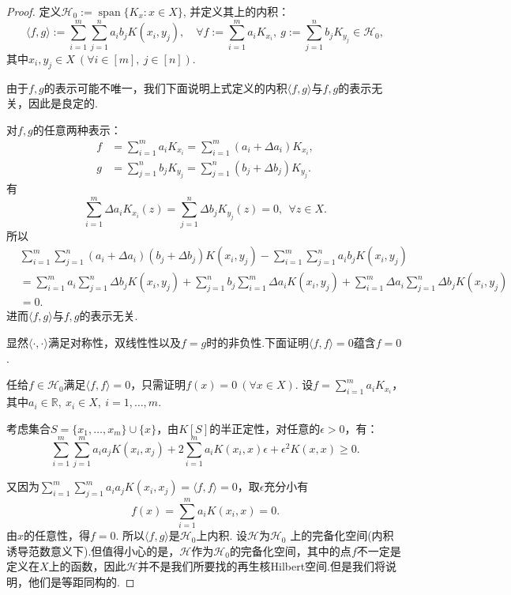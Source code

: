 \documentclass[../master.tex]{subfiles}
\begin{document}
\begin{proof}
    定义$\mathcal{H}_0:=\operatorname{span}\{K_x:x\in X\}$, 并定义其上的内积：
    \begin{equation}
        \langle f,g\rangle:=\sum_{i=1}^m\sum_{j=1}^na_ib_jK(x_i,y_j),\quad\forall f:=\sum_{i=1}^ma_iK_{x_i}, ~g:=\sum_{j=1}^nb_jK_{y_j}\in \mathcal{H}_0,
    \end{equation}
    其中$x_i,y_j\in X~(\forall i\in[m],~j\in [n])$.  

    由于$f,g$的表示可能不唯一，我们下面说明上式定义的内积$\langle f,g\rangle$与$f,g$的表示无关，因此是良定的.
    
    对$f,g$的任意两种表示：
    \begin{align*}
        f&=\sum_{i=1}^ma_iK_{x_i}=\sum_{i=1}^m(a_i+\Delta a_i)K_{x_i},\\
        g&=\sum_{j=1}^nb_j K_{y_j}=\sum_{j=1}^n(b_j+\Delta b_j)K_{y_j}.
    \end{align*}
    有
     \begin{equation*}
        \sum_{i=1}^m\Delta a_i  K_{x_i}(z)=\sum_{j=1}^n\Delta b_j  K_{y_j}(z)=0,~~\forall z\in X.
    \end{equation*}
    所以
    \begin{align*}
        &\sum_{i=1}^m\sum_{j=1}^n(a_i+\Delta a_i)(b_j+\Delta b_j)K(x_i,y_j)-\sum_{i=1}^m\sum_{j=1}^na_ib_jK(x_i,y_j)\\
        &=\sum_{i=1}^ma_i\sum_{j=1}^n \Delta b_j K(x_i,y_j)+\sum_{j=1}^n b_j\sum_{i=1}^m\Delta a_i K(x_i,y_j)+\sum_{i=1}^m\Delta a_i\sum_{j=1}^n \Delta b_j K(x_i,y_j)\\
        &=0.
    \end{align*}
    进而$\langle f,g\rangle$与$f,g$的表示无关.

    显然$\langle\cdot,\cdot\rangle$满足对称性，双线性性以及$f=g$时的非负性.下面证明$\langle f,f\rangle=0$蕴含$f=0$.

    任给$f\in \mathcal{H}_0$满足$\langle f,f\rangle=0$，只需证明$f(x)=0~(\forall x\in X)$. 设$f=\sum_{i=1}^m a_i K_{x_i}$，其中$a_i\in\mathbb{R},~x_i\in X,~i=1,\dots,m.$

    考虑集合$S=\{x_1,\dots,x_m\}\cup \{x\}$，由$K[S]$的半正定性，对任意的$\epsilon>0$，有：
    \begin{equation*}
        \sum_{i=1}^m\sum_{j=1}^m a_i a_j K(x_i,x_j)+2\sum_{i=1}^m a_iK(x_i,x)\epsilon+\epsilon^2K(x,x)\geq 0 .
    \end{equation*}

    又因为$\sum_{i=1}^m\sum_{j=1}^m a_i a_j K(x_i,x_j)=\langle f,f\rangle =0$，取$\epsilon$充分小有
    $$f(x)=\sum_{i=1}^m a_iK(x_i,x)=0.$$
    由$x$的任意性，得$f=0$. 所以$\langle f,g \rangle$是$\mathcal{H}_0$上内积. 设$\mathcal{H}$为$\mathcal{H}_0$ 上的完备化空间(内积诱导范数意义下).但值得小心的是，$\mathcal{H}$作为$\mathcal{H}_0$的完备化空间，其中的点$f$不一定是定义在$X$上的函数，因此$\mathcal{H}$并不是我们所要找的再生核Hilbert空间.但是我们将说明，他们是等距同构的.


\end{proof}
\end{document}

